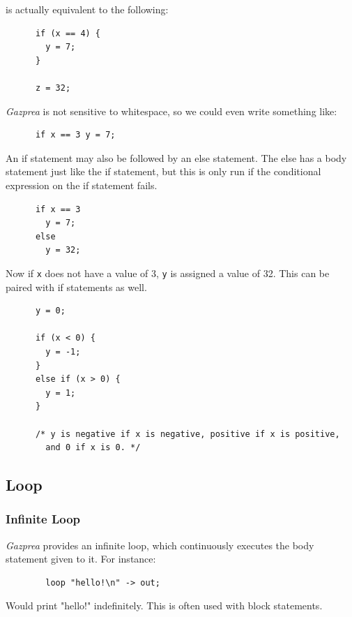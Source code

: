 \documentclass{article}
\begin{document}
    is actually equivalent to the following:

    \begin{lstlisting}
      if (x == 4) {
        y = 7;
      }

      z = 32;
    \end{lstlisting}

    \textit{Gazprea} is not sensitive to whitespace, so we could even write something like:

    \begin{lstlisting}
      if x == 3 y = 7;
    \end{lstlisting}

    An if statement may also be followed by an else statement. The else has a body statement just like the if
    statement, but this is only run if the conditional expression on the if statement fails.

    \begin{lstlisting}
      if x == 3
        y = 7;
      else
        y = 32;
    \end{lstlisting}

    Now if \texttt{x} does not have a value of 3, \texttt{y} is assigned a value of 32. This can be paired with if
    statements as well.

    \begin{lstlisting}
      y = 0;

      if (x < 0) {
        y = -1;
      }
      else if (x > 0) {
        y = 1;
      }

      /* y is negative if x is negative, positive if x is positive,
        and 0 if x is 0. */
    \end{lstlisting}


  \subsection{Loop}\label{sec:loop}
    \subsubsection{Infinite Loop}\label{sec:infLoop}
      \textit{Gazprea} provides an infinite loop, which continuously executes the body statement given to it. For
      instance:

      \begin{lstlisting}
        loop "hello!\n" -> out;
      \end{lstlisting}

      Would print "hello!" indefinitely. This is often used with block statements.
\end{document}
